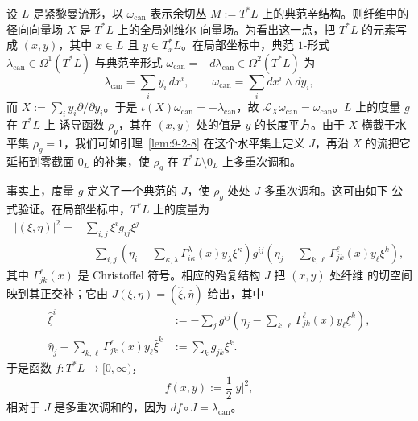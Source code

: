\begin{example}\label{ex:9-2-13}
设 $L$ 是紧黎曼流形，以 $\omega_{\mathrm{can}}$ 表示余切丛
$M:=T^*L$ 上的典范辛结构。则纤维中的径向向量场 $X$ 是 $T^*L$ 上的全局刘维尔
向量场。为看出这一点，把 $T^*L$ 的元素写成 $(x,y)$，其中
$x\in L$ 且 $y\in T_x^*L$。在局部坐标中，典范 $1$-形式
$\lambda_{\mathrm{can}}\in\Omega^1(T^*L)$ 与典范辛形式
$\omega_{\mathrm{can}}=-d\lambda_{\mathrm{can}}\in\Omega^2(T^*L)$ 为
\[
  \lambda_{\mathrm{can}}=\sum_i y_i\,dx^i,
  \qquad
  \omega_{\mathrm{can}}=\sum_i dx^i\wedge dy_i,
\]
而 $X:=\sum_i y_i\partial/\partial y_i$。于是
$\iota(X)\omega_{\mathrm{can}}=-\lambda_{\mathrm{can}}$，故
$\mathcal L_X\omega_{\mathrm{can}}=\omega_{\mathrm{can}}$。$L$ 上的度量 $g$ 在 $T^*L$ 上
诱导函数 $\rho_g$，其在 $(x,y)$ 处的值是 $y$ 的长度平方。由于 $X$ 横截于水平集
$\rho_g=1$，我们可如引理~\ref{lem:9-2-8} 在这个水平集上定义 $J$，再沿 $X$ 的流把它
延拓到零截面 $0_L$ 的补集，使 $\rho_g$ 在 $T^*L\setminus0_L$ 上多重次调和。

事实上，度量 $g$ 定义了一个典范的 $J$，使 $\rho_g$ 处处 $J$-多重次调和。这可由如下
公式验证。在局部坐标中，$T^*L$ 上的度量为
\[
\begin{aligned}
  |(\xi,\eta)|^2
  ={}&\sum_{i,j}\xi^ig_{ij}\xi^j\\
  &+\sum_{i,j}
    \left(\eta_i-\sum_{\kappa,\lambda}
      \Gamma^\lambda_{i\kappa}(x)y_\lambda\xi^\kappa\right)
    g^{ij}
    \left(\eta_j-\sum_{k,\ell}
      \Gamma^\ell_{jk}(x)y_\ell\xi^k\right),
\end{aligned}
\]
其中 $\Gamma^\ell_{jk}(x)$ 是 Christoffel 符号。相应的殆复结构 $J$ 把 $(x,y)$ 处纤维
的切空间映到其正交补；它由 $J(\xi,\eta)=(\widehat\xi,\widehat\eta)$ 给出，其中
\[
\begin{aligned}
  \widehat\xi^i
  &:=-\sum_jg^{ij}
     \left(\eta_j-\sum_{k,\ell}
       \Gamma^\ell_{jk}(x)y_\ell\xi^k\right),\\
  \widehat\eta_j-
    \sum_{k,\ell}\Gamma^\ell_{jk}(x)y_\ell\widehat\xi^k
  &:=\sum_kg_{jk}\xi^k.
\end{aligned}
\]
于是函数 $f:T^*L\to[0,\infty)$，
\[
  f(x,y):=\frac12|y|^2,
\]
相对于 $J$ 是多重次调和的，因为 $df\circ J=\lambda_{\mathrm{can}}$。
\end{example}

